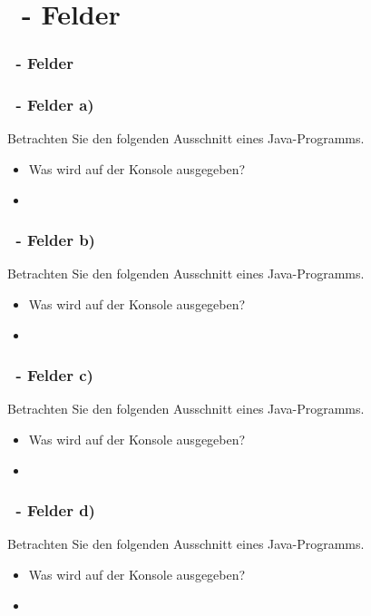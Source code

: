 \def\stitle{\theexercise\ - Felder}
\section{\stitle}
\begin{frame}
  \frametitle{\stitle}%
\tableofcontents[current]
\end{frame}



\begin{frame}[t]%
    \frametitle{\stitle \: a)}

  Betrachten Sie den folgenden Ausschnitt eines Java-Programms.
  
  \begin{itemize}
  \item Was wird auf der Konsole ausgegeben?
  \pause
  \item \code{[1, 3, 6, 10, 15]}
  \end{itemize}
\end{frame}


\begin{frame}[t]%
    \frametitle{\stitle \: b)}

  Betrachten Sie den folgenden Ausschnitt eines Java-Programms.
  
  \begin{itemize}
  \item Was wird auf der Konsole ausgegeben?
  \pause
  \item \code{[1, 3, 5, 7, 9]}
  \end{itemize}
\end{frame}

\begin{frame}[t]%
    \frametitle{\stitle \: c)}

  Betrachten Sie den folgenden Ausschnitt eines Java-Programms.
  
  \begin{itemize}
  \item Was wird auf der Konsole ausgegeben?
  \pause
  \item \code{[1, 2, 3, 2, 1]}
  \end{itemize}
\end{frame}

\begin{frame}[t]%
    \frametitle{\stitle \: d)}

  Betrachten Sie den folgenden Ausschnitt eines Java-Programms.
  
  \begin{itemize}
  \item Was wird auf der Konsole ausgegeben?
  \pause
  \item \code{[1, 4, 9, 16, 25]}
  \end{itemize}
\end{frame}
